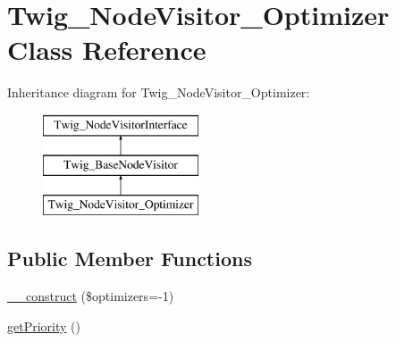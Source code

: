 \hypertarget{classTwig__NodeVisitor__Optimizer}{}\section{Twig\+\_\+\+Node\+Visitor\+\_\+\+Optimizer Class Reference}
\label{classTwig__NodeVisitor__Optimizer}
Inheritance diagram for Twig\+\_\+\+Node\+Visitor\+\_\+\+Optimizer\+:\begin{figure}[H]
\begin{center}
\leavevmode
\includegraphics[height=3.000000cm]{classTwig__NodeVisitor__Optimizer}
\end{center}
\end{figure}
\subsection*{Public Member Functions}
\begin{DoxyCompactItemize}
\item 
\hyperlink{classTwig__NodeVisitor__Optimizer_a6e4bc05bb72b4cbfaef36cb99e9a6eaf}{\+\_\+\+\_\+construct} (\$optimizers=-\/1)
\item 
\hyperlink{classTwig__NodeVisitor__Optimizer_a829cdb2d3592dca089ad29d9deb5988a}{get\+Priority} ()
\end{DoxyCompactItemize}
